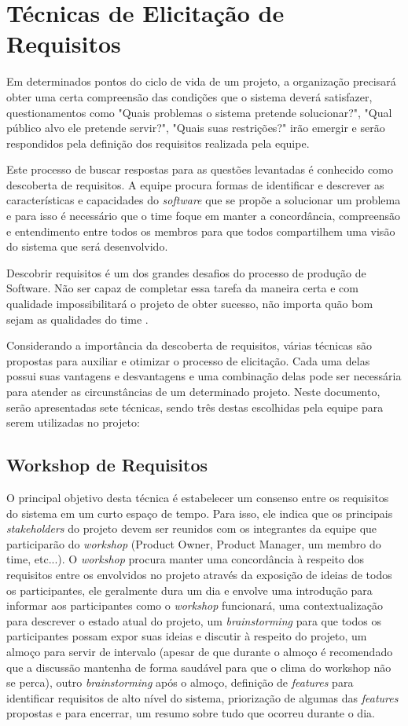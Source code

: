 \chapter[Técnicas de Elicitação de Requisitos]{Técnicas de Elicitação de Requisitos}
Em determinados pontos do ciclo de vida de um projeto, a organização precisará obter uma certa compreensão das condições que o sistema deverá satisfazer, questionamentos como "Quais problemas o sistema pretende solucionar?", "Qual público alvo ele pretende servir?", "Quais suas restrições?" irão emergir e serão respondidos pela definição dos requisitos realizada pela equipe.

Este processo de buscar respostas para as questões levantadas é conhecido como descoberta de requisitos. A equipe procura formas de identificar e descrever as características e capacidades do \emph{software} que se propõe a solucionar um problema e para isso é necessário que o time foque em manter a concordância, compreensão e entendimento entre todos os membros para que todos compartilhem uma visão do sistema que será desenvolvido.

Descobrir requisitos é um dos grandes desafios do processo de produção de Software. Não ser capaz de completar essa tarefa da maneira certa e com qualidade impossibilitará o projeto de obter sucesso, não importa quão bom sejam as qualidades do time \cite[p. 227-228]{safe001}.

Considerando a importância da descoberta de requisitos, várias técnicas são propostas para auxiliar e otimizar o processo de elicitação. Cada uma delas possui suas vantagens e desvantagens e uma combinação delas pode ser necessária para atender as circunstâncias de um determinado projeto. Neste documento, serão apresentadas sete técnicas, sendo três destas escolhidas pela equipe para serem utilizadas no projeto:

\section{Workshop de Requisitos}
O principal objetivo desta técnica é estabelecer um consenso entre os requisitos do sistema em um curto espaço de tempo. Para isso, ele indica que os principais \emph{stakeholders} do projeto devem ser reunidos com os integrantes da equipe que participarão do \emph{workshop} (Product Owner, Product Manager, um membro do time, etc...). O \emph{workshop} procura manter uma concordância à respeito dos requisitos entre os envolvidos no projeto através da exposição de ideias de todos os participantes, ele geralmente dura um dia e envolve uma introdução para informar aos participantes como o \emph{workshop} funcionará, uma contextualização para descrever o estado atual do projeto, um \emph{brainstorming} para que todos os participantes possam expor suas ideias e discutir à respeito do projeto, um almoço para servir de intervalo (apesar de que durante o almoço é recomendado que a discussão mantenha de forma saudável para que o clima do workshop não se perca), outro \emph{brainstorming} após o almoço, definição de \emph{features} para identificar requisitos de alto nível do sistema, priorização de algumas das \emph{features} propostas e para encerrar, um resumo sobre tudo que ocorreu durante o dia.

